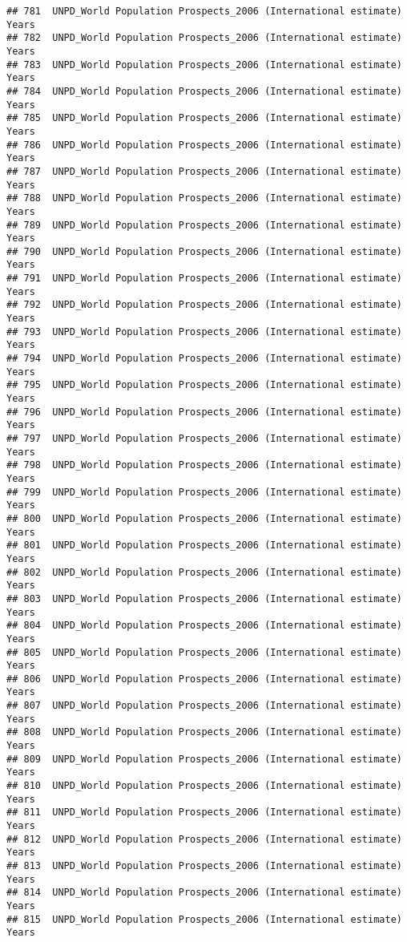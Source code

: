 \documentclass[]{article}
\begin{document}
\begin{verbatim}
## 781  UNPD_World Population Prospects_2006 (International estimate) Years
## 782  UNPD_World Population Prospects_2006 (International estimate) Years
## 783  UNPD_World Population Prospects_2006 (International estimate) Years
## 784  UNPD_World Population Prospects_2006 (International estimate) Years
## 785  UNPD_World Population Prospects_2006 (International estimate) Years
## 786  UNPD_World Population Prospects_2006 (International estimate) Years
## 787  UNPD_World Population Prospects_2006 (International estimate) Years
## 788  UNPD_World Population Prospects_2006 (International estimate) Years
## 789  UNPD_World Population Prospects_2006 (International estimate) Years
## 790  UNPD_World Population Prospects_2006 (International estimate) Years
## 791  UNPD_World Population Prospects_2006 (International estimate) Years
## 792  UNPD_World Population Prospects_2006 (International estimate) Years
## 793  UNPD_World Population Prospects_2006 (International estimate) Years
## 794  UNPD_World Population Prospects_2006 (International estimate) Years
## 795  UNPD_World Population Prospects_2006 (International estimate) Years
## 796  UNPD_World Population Prospects_2006 (International estimate) Years
## 797  UNPD_World Population Prospects_2006 (International estimate) Years
## 798  UNPD_World Population Prospects_2006 (International estimate) Years
## 799  UNPD_World Population Prospects_2006 (International estimate) Years
## 800  UNPD_World Population Prospects_2006 (International estimate) Years
## 801  UNPD_World Population Prospects_2006 (International estimate) Years
## 802  UNPD_World Population Prospects_2006 (International estimate) Years
## 803  UNPD_World Population Prospects_2006 (International estimate) Years
## 804  UNPD_World Population Prospects_2006 (International estimate) Years
## 805  UNPD_World Population Prospects_2006 (International estimate) Years
## 806  UNPD_World Population Prospects_2006 (International estimate) Years
## 807  UNPD_World Population Prospects_2006 (International estimate) Years
## 808  UNPD_World Population Prospects_2006 (International estimate) Years
## 809  UNPD_World Population Prospects_2006 (International estimate) Years
## 810  UNPD_World Population Prospects_2006 (International estimate) Years
## 811  UNPD_World Population Prospects_2006 (International estimate) Years
## 812  UNPD_World Population Prospects_2006 (International estimate) Years
## 813  UNPD_World Population Prospects_2006 (International estimate) Years
## 814  UNPD_World Population Prospects_2006 (International estimate) Years
## 815  UNPD_World Population Prospects_2006 (International estimate) Years

\end{verbatim}
\end{document}
